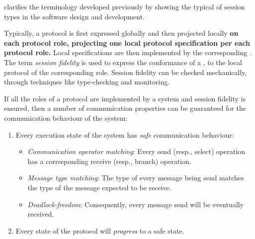 


 clarifies the terminology
developed previously by showing the typical
 of session types in the software design and development. 

Typically, a protocol is first expressed globally and then
projected locally \textbf{on each protocol role, projecting one local protocol specification per each protocol role.}
Local specifications are then implemented by the corresponding
.
The term {\em session fidelity} is used to express
the conformance of a , to the local protocol of the
corresponding role. Session fidelity can be checked mechanically,
through techniques like type-checking and monitoring.

If all the roles of a protocol are implemented by a
system and session fidelity is ensured,
then a number of communication properties can be guaranteed
for the communication behaviour of the system:
%
\begin{enumerate}[label=$\bullet$]
	\item	Every execution state of the system has {\em safe} communication behaviour:
	\begin{itemize}
		\item	{\em Communication operator matching}: Every send (resp., select) operation has a corresponding receive (resp., branch) operation.
		\item	{\em Message type matching}: The type of every message being send matches the type of the message expected to be receive.
		\item	{\em Deadlock-freedom}: Consequently, every message send will be eventually received.
	\end{itemize}
	
	\item	Every state of the protocol will {\em progress} to a safe state.
\end{enumerate}


%

